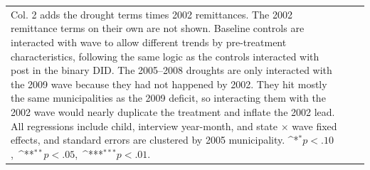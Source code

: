 \documentclass[12pt]{article}
\def\sym#1{\ifmmode^{#1}\else\(^{#1}\)\fi}
\begin{document}
\begin{longtable}{l*{2}{c}}
{Col. 2 adds the drought terms times 2002 remittances. The 2002 remittance terms on their own are not shown.
Baseline controls are interacted with wave to allow different trends by pre-treatment characteristics, following the same logic as the controls interacted with post in the binary DID. The 2005--2008 droughts are only interacted with the 2009 wave because they had not happened by 2002. They hit mostly the same municipalities as the 2009 deficit, so interacting them with the 2002 wave would nearly duplicate the treatment and inflate the 2002 lead. All regressions include child, interview year-month, and state \ensuremath{\times} wave fixed effects, and standard errors are clustered by 2005 municipality. \mbox{\sym{*}\(p<.10\), \sym{**}\(p<.05\), \sym{***}\(p<.01\).}}\\
\end{longtable}
\endgroup
\end{document}
